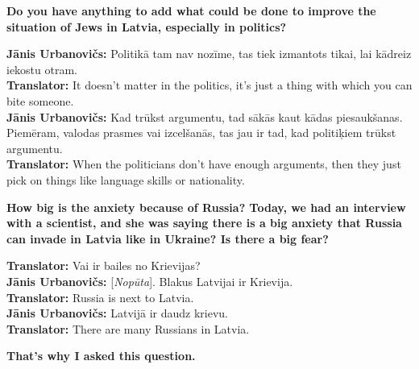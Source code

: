 \textbf{Do you have anything to add what could be done to improve the situation of Jews in Latvia, especially in politics?}  

\textbf{Jānis Urbanovičs:} Politikā tam nav nozīme, tas tiek izmantots tikai, lai kādreiz iekostu otram.\\  
\textbf{Translator:} It doesn't matter in the politics, it’s just a thing with which you can bite someone.\\
\textbf{Jānis Urbanovičs:} Kad trūkst argumentu, tad sākās kaut kādas piesaukšanas. Piemēram, valodas prasmes vai izcelšanās, tas jau ir tad, kad politiķiem trūkst argumentu.\\ 
\textbf{Translator:} When the politicians don't have enough arguments, then they just pick on things like language skills or nationality. 

\textbf{How big is the anxiety because of Russia? Today, we had an interview with a scientist, and she was saying there is a big anxiety that Russia can invade in Latvia like in Ukraine? Is there a big fear?}  

\textbf{Translator:} Vai ir bailes no Krievijas?\\ 
\textbf{Jānis Urbanovičs:} [\textit{Nopūta}]. Blakus Latvijai ir Krievija.\\
\textbf{Translator:} Russia is next to Latvia.\\  
\textbf{Jānis Urbanovičs:} Latvijā ir daudz krievu.\\ 
\textbf{Translator:} There are many Russians in Latvia.  

\textbf{That's why I asked this question.} 


